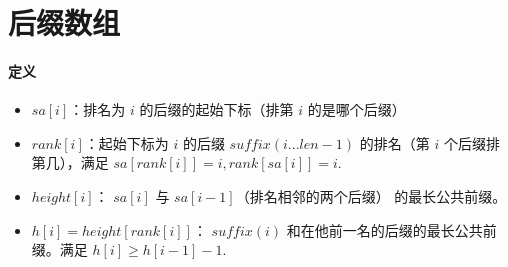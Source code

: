 \section{后缀数组}

\paragraph{定义}

\begin{itemize}
    \item $sa[i]$：排名为 $i$ 的后缀的起始下标（排第 $i$ 的是哪个后缀）
    \item $rank[i]$：起始下标为 $i$ 的后缀 $suffix(i ... len-1)$ 的排名（第 $i$ 个后缀排第几），满足 $sa[rank[i]] = i, rank[sa[i]] = i$.
    \item $height[i]$： $sa[i]$ 与 $sa[i-1]$（排名相邻的两个后缀） 的最长公共前缀。
    \item $h[i] = height[rank[i]]$： $suffix(i)$ 和在他前一名的后缀的最长公共前缀。满足 $h[i] \ge h[i-1] - 1$.
\end{itemize}

